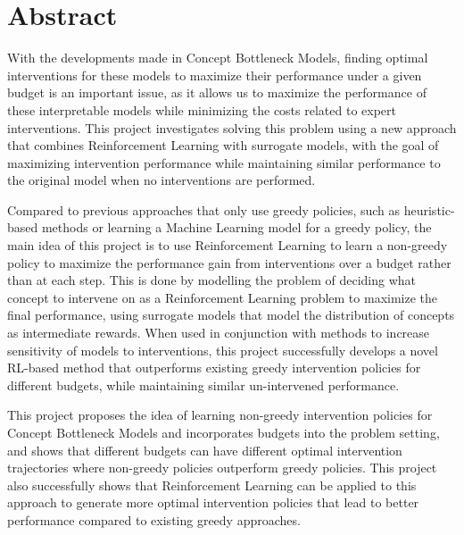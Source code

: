 \documentclass[../main.tex]{subfiles}
\begin{document}
\chapter*{Abstract}


With the developments made in Concept Bottleneck Models,
finding optimal interventions for these models
to maximize their performance under a given budget is an important issue, as it allows
us to maximize the performance of these interpretable models while minimizing
the costs related to expert interventions. This project investigates solving this problem
using a new approach that combines Reinforcement Learning with surrogate models, with the goal
of maximizing intervention performance while maintaining similar performance to the original model
when no interventions are performed.

Compared to 
previous approaches that only use greedy policies, 
such as heuristic-based methods or learning a Machine Learning model for a greedy policy,
the main idea of this project
is to use Reinforcement Learning to learn a non-greedy policy to maximize the performance
gain from interventions over a budget rather than at each step. This is done by modelling the problem 
of deciding
what concept to intervene on as a Reinforcement Learning problem to maximize the final performance,
using surrogate models that model the distribution of concepts as intermediate rewards. When used in conjunction
with methods to increase sensitivity of models to interventions, this project successfully develops a novel
RL-based method that outperforms existing greedy intervention policies for different budgets, while maintaining
similar un-intervened performance. 

This project proposes the idea of learning non-greedy
intervention policies for Concept Bottleneck Models and incorporates budgets into the problem setting, 
and shows that
different budgets can have different optimal intervention trajectories where
non-greedy policies outperform greedy policies.
This project also successfully shows that 
Reinforcement Learning can be applied to this approach to generate more optimal intervention policies
that lead to better performance
compared to existing greedy approaches.
\end{document}
